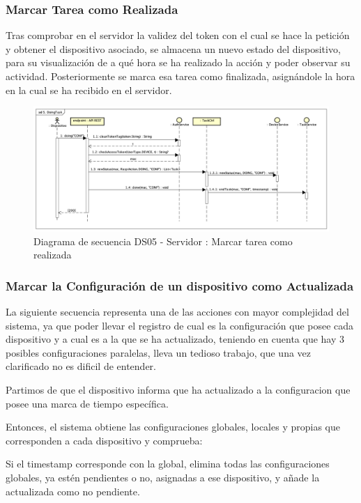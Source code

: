 \subsubsection{Marcar Tarea como Realizada}

Tras comprobar en el servidor la validez del token con el cual se hace la petición y obtener el dispositivo asociado, se almacena un nuevo estado del dispositivo, para su visualización de a qué hora se ha realizado la acción y poder observar su actividad. Posteriormente se marca esa tarea como finalizada, asignándole la hora en la cual se ha recibido en el servidor.

\begin{figure}[H]
    \centering
    \includegraphics[width=14cm]{./img/sequence/diagram/doingTask.png}
    \caption{Diagrama de secuencia DS05 - Servidor : Marcar tarea como realizada}
    \label{fig:seq.doing}
\end{figure}


\subsubsection{Marcar la Configuración de un dispositivo como Actualizada}

La siguiente secuencia representa una de las acciones con mayor complejidad del sistema, ya que poder llevar el registro de cual es la configuración que posee cada dispositivo y a cual es a la que se ha actualizado, teniendo en cuenta que hay 3 posibles configuraciones paralelas, lleva un tedioso trabajo, que una vez clarificado no es dificil de entender.

Partimos de que el dispositivo informa que ha actualizado a la configuracion que posee una marca de tiempo específica.

Entonces, el sistema obtiene las configuraciones globales, locales y propias que corresponden a cada dispositivo y comprueba:

Si el timestamp corresponde con la global, elimina todas las configuraciones globales, ya estén pendientes o no, asignadas a ese dispositivo, y añade la actualizada como no pendiente.

